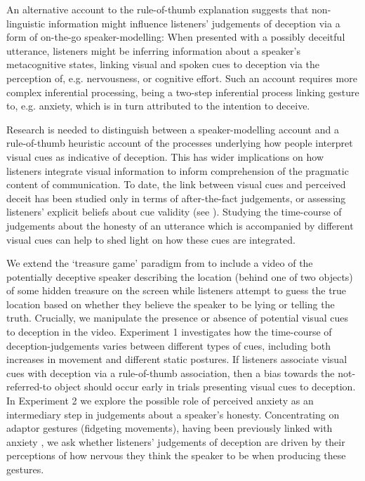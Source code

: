 \documentclass[a4paper,man,natbib]{apa6}
\begin{document}
An alternative account to the rule-of-thumb explanation suggests that non-linguistic information might influence listeners' judgements of deception via a form of on-the-go speaker-modelling: 
When presented with a possibly deceitful utterance, listeners might be inferring information about a speaker's metacognitive states, linking visual and spoken cues to deception via the perception of, e.g. nervousness, or cognitive effort. 
Such an account requires more complex inferential processing, being a two-step inferential process linking gesture to, e.g. anxiety, which is in turn attributed to the intention to deceive.

Research is needed to distinguish between a speaker-modelling account and a rule-of-thumb heuristic account of the processes underlying how people interpret visual cues as indicative of deception.
This has wider implications on how listeners integrate visual information to inform comprehension of the pragmatic content of communication.
To date, the link between visual cues and perceived deceit has been studied only in terms of after-the-fact judgements, or assessing listeners' explicit beliefs about cue validity (see \citealt{Vrij1996a, Zuckerman1981a}).
Studying the time-course of judgements about the honesty of an utterance which is accompanied by different visual cues can help to shed light on how these cues are integrated.


We extend the `treasure game' paradigm from \citet{Loy2017} to include a video of the potentially deceptive speaker describing the location (behind one of two objects) of some hidden treasure on the screen while listeners attempt to guess the true location based on whether they believe the speaker to be lying or telling the truth. 
Crucially, we manipulate the presence or absence of potential visual cues to deception in the video.
Experiment 1 investigates how the time-course of deception-judgements varies between different types of cues, including both increases in movement and different static postures.
If listeners associate visual cues with deception via a rule-of-thumb association, then a bias towards the not-referred-to object should occur early in trials presenting visual cues to deception.
In Experiment 2 we explore the possible role of perceived anxiety as an intermediary step in judgements about a speaker's honesty.
Concentrating on adaptor gestures (fidgeting movements), having been previously linked with anxiety \citep{Gregersen2005}, we ask whether listeners' judgements of deception are driven by their perceptions of how nervous they think the speaker to be when producing these gestures.
\end{document}
